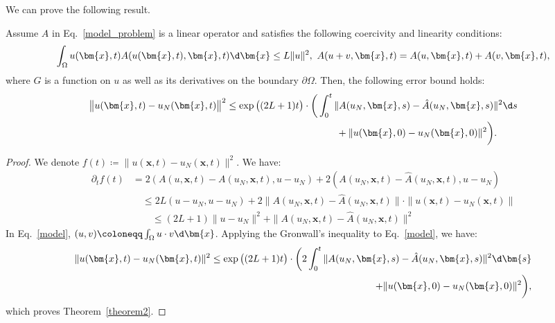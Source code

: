 We can prove the following result.
\begin{theorem}
\label{theorem2}
\rm
Assume $A$ in Eq.~\eqref{model_problem} is a linear operator and satisfies the following coercivity and linearity conditions: 
\begin{equation}
\begin{aligned}
    \int_{\Omega} u(\bm{x}, t)A(u(\bm{x}, t), \bm{x}, t)\d\bm{x}\leq  L\|u\|^2,\,\, A(u+v, \bm{x}, t) = A(u, \bm{x}, t)+ A(v, \bm{x}, t),
    \end{aligned}
    \label{A_condition}
\end{equation}
where $G$ is a function on $u$ as well as its derivatives on the boundary $\partial\Omega$.  
Then, the following error bound holds:
\begin{equation}
\begin{aligned}
    \big\|u(\bm{x}, t)-u_N(\bm{x}, t)\big\|^2&\leq \exp\big((2L+1)t\big)\cdot \bigg(\int_0^t \|A(u_N,\bm{x}, s)-\hat{A}(u_N, \bm{x}, s)\|^2\d s \\
    &\hspace{4cm} + \|u(\bm{x}, 0) - u_N(\bm{x}, 0)\|^2\bigg).
    \end{aligned}
\end{equation}
\end{theorem}

\begin{proof}
    We denote $f(t)\coloneqq\|u(\bm{x}, t) - u_N(\bm{x}, t)\|^2$. We have:
    \begin{equation}
    \begin{aligned}
        \partial_t f(t) &= 2(A(u, \bm{x},t) - A(u_N, \bm{x},t), u-u_N) + 2(A(u_N, \bm{x},t) - \hat{A}(u_N, \bm{x},t), u - u_N)\\
        &\quad\leq 2L(u-u_N, u-u_N) +  2\|A(u_N, \bm{x}, t)-\hat{A}(u_N, \bm{x}, t)\|\cdot\|u(\bm{x}, t) - u_N(\bm{x}, t)\|\\
        &\quad\quad\leq (2L+1)\|u-u_N\|^2 + \|A(u_N, \bm{x}, t)-\hat{A}(u_N, \bm{x}, t)\|^2
        \end{aligned}
        \label{model}
    \end{equation}
    In Eq.~\eqref{model}, $(u, v)\coloneqq \int_\Omega u\cdot v\d\bm{x}$. Applying the Gronwall's inequality to Eq.~\eqref{model}, we have:
    \begin{equation}
        \begin{aligned}
        \|u(\bm{x}, t)-u_N(\bm{x}, t)\|^2\leq \exp\big((2L+1)t\big)\cdot \bigg(2 \int_0^t 
         \|A(u_N, \bm{x}, s)-\hat{A}(u_N, \bm{x}, s)\|^2\d\bm{s} \\+ \|u(\bm{x}, 0) - u_N(\bm{x}, 0)\|^2\bigg),
        \end{aligned}
        \label{temporal_error_bound}
    \end{equation}
    which proves Theorem~\ref{theorem2}.
\end{proof}

